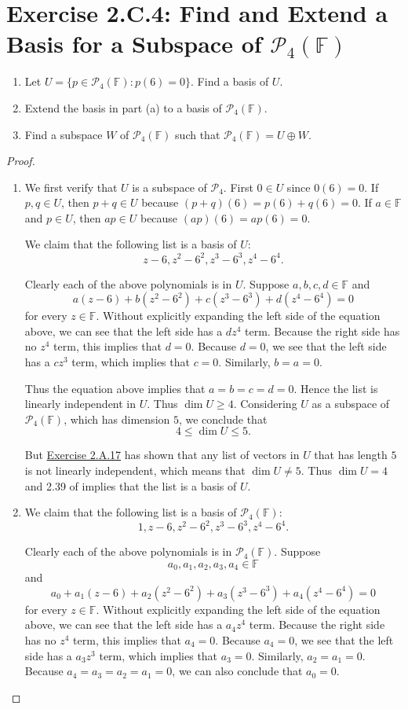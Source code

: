 \section{Exercise 2.C.4: Find and Extend a Basis for a Subspace of $\mathcal{P}_4(\mathbb{F})$}
\begin{enumerate}[label=(\alph*)]
\item Let $U=\{p\in\mathcal{P}_4(\mathbb{F}):p(6)=0\}$. Find a basis of $U$.
\item Extend the basis in part (a) to a basis of $\mathcal{P}_4(\mathbb{F})$.
\item Find a subspace $W$ of $\mathcal{P}_4(\mathbb{F})$ such that $\mathcal{P}_4(\mathbb{F})=U\oplus W$.
\end{enumerate}
\begin{proof}
\begin{enumerate}[label=(\alph*)]
\item We first verify that $U$ is a subspace of $\mathcal{P}_4$. First $0\in U$ since $0(6)=0$. If $p,q\in U$, then $p+q\in U$ because $(p+q)(6)=p(6)+q(6)=0$. If $a\in\mathbb{F}$ and $p\in U$, then $ap\in U$ because $(ap)(6)=ap(6)=0$.

We claim that the following list is a basis of $U$:\[
z-6,z^2-6^2,z^3-6^3,z^4-6^4.
\]

Clearly each of the above polynomials is in $U$. Suppose $a,b,c,d\in\mathbb{F}$ and\[
a(z-6)+b(z^2-6^2)+c(z^3-6^3)+d(z^4-6^4)=0
\] for every $z\in\mathbb{F}$. Without explicitly expanding the left side of the equation above, we can see that the left side has a $dz^4$ term. Because the right side has no $z^4$ term, this implies that $d=0$. Because $d=0$, we see that the left side has a $cz^3$ term, which implies that $c=0$. Similarly, $b=a=0$.

Thus the equation above implies that $a=b=c=d=0$. Hence the list is linearly independent in $U$. Thus $\dim U\geqslant4$. Considering $U$ as a subspace of $\mathcal{P}_4(\mathbb{F})$, which has dimension $5$, we conclude that\[
4\leqslant\dim U\leqslant 5.
\]

But \hyperref[Exercise 2.A.17]{Exercise 2.A.17} has shown that any list of vectors in $U$ that has length $5$ is not linearly independent, which means that $\dim U\ne 5$. Thus $\dim U=4$ and 2.39 of \cite{axler2014linear} implies that the list is a basis of $U$.
\item We claim that the following list is a basis of $\mathcal{P}_4(\mathbb{F})$:\[
1,z-6,z^2-6^2,z^3-6^3,z^4-6^4.
\]

Clearly each of the above polynomials is in $\mathcal{P}_4(\mathbb{F})$. Suppose\[
a_0,a_1,a_2,a_3,a_4\in\mathbb{F}
\]and\[
a_0+a_1(z-6)+a_2(z^2-6^2)+a_3(z^3-6^3)+a_4(z^4-6^4)=0
\] for every $z\in\mathbb{F}$. Without explicitly expanding the left side of the equation above, we can see that the left side has a $a_4z^4$ term. Because the right side has no $z^4$ term, this implies that $a_4=0$. Because $a_4=0$, we see that the left side has a $a_3z^3$ term, which implies that $a_3=0$. Similarly, $a_2=a_1=0$. Because $a_4=a_3=a_2=a_1=0$, we can also conclude that $a_0=0$.


\end{enumerate}
\end{proof}
